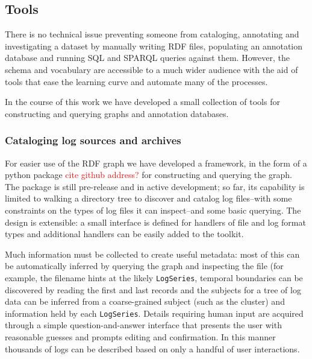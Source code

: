 \subsection{Tools}

There is no technical issue preventing someone from cataloging, 
annotating and investigating a dataset 
by manually writing RDF files, populating an annotation database 
and running SQL and SPARQL queries against them. However, 
the schema and vocabulary are accessible to a much wider 
audience with the aid of tools that ease the learning curve and automate many of the processes.

In the course of this work we have developed a small collection 
of tools for constructing and querying graphs and annotation databases.

%

\subsubsection{Cataloging log sources and archives}

For easier use of the RDF graph we have developed a framework, in 
the form of a python package \textcolor{red}{cite github address?}
for constructing and querying the graph. The package is still pre-release
and in active development; so far, its capability is limited to 
walking a directory tree to discover and catalog log files--with 
some constraints on the types of log files it can inspect--and some 
basic querying. The design is extensible: a small interface
is defined for handlers of file and log format types and additional 
handlers can be easily added to the toolkit.

Much information must be collected to create useful metadata: most of
this can be automatically inferred by querying the graph and inspecting 
the file (for example, the filename hints at the likely \texttt{LogSeries},
temporal boundaries can be discovered by reading the first and last records
and the subjects for a tree of log data can be inferred from a coarse-grained subject (such as the cluster) and information held by each \texttt{LogSeries}. Details requiring human input are acquired through 
a simple question-and-answer interface that presents the user with 
reasonable guesses and prompts editing and confirmation. In this manner 
thousands of logs can be described based on only a handful of user 
interactions.



